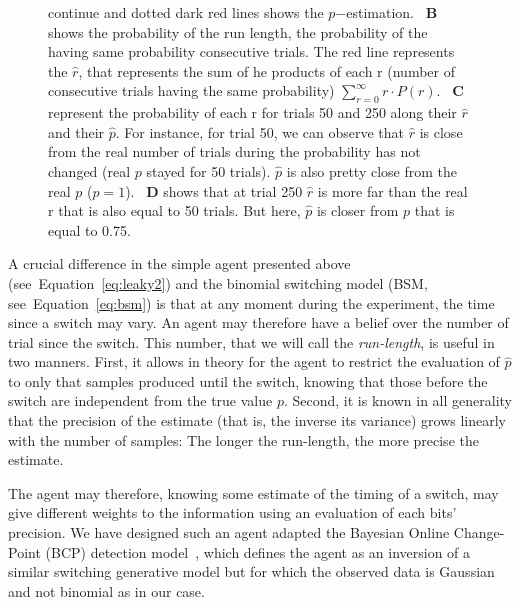 \documentclass[profile,final,english,draft]{article}%
\newcommand{\citep}[1]{\parencite{#1}}
\newcommand{\seeEq}[1]{Equation~\ref{eq:#1}}
\begin{document}
\begin{figure}
{continue and dotted dark red lines shows the $p$$-$estimation.
~\textbf{B} shows the probability of the run length, 
the probability of the having same probability consecutive trials. 
The red line represents the $\hat{r}$, 
that represents the sum of he products of each r
(number of consecutive trials having the same probability)  
$\sum_{r=0}^\infty r \cdot P(r)$.
~\textbf{C} represent the probability of each r for trials 50 and 250 
along their $\hat{r}$ and their $\hat{p}$. 
For instance, for trial 50, we can observe that $\hat{r}$ is close 
from the real number of trials during the probability has not changed (real $p$ stayed for 50 trials). 
$\hat{p}$ is also pretty close from the real $p$ ($p=1$).
~\textbf{D} shows that at trial 250 $\hat{r}$ is more far than the real r 
that is also equal to 50 trials. 
But here, $\hat{p}$ is closer from $p$ that is equal to 0.75.
}
\label{fig:bayesianchangepoint}
\end{figure}
A crucial difference in the simple agent presented above (see~\seeEq{leaky2})
and the binomial switching model (BSM, see~\seeEq{bsm})
is that at any moment during the experiment, the time since a switch may vary.
An agent may therefore have a belief over the number of trial since the switch.
This number, that we will call the \emph{run-length}, is useful in two manners. 
First, it allows in theory for the agent to restrict the evaluation of $\hat{p}$ 
to only that samples produced until the switch,
knowing that those before the switch are independent from the true value $p$.
Second, it is known in all generality that the precision of the estimate  
(that is, the inverse its variance)
grows linearly with the number of samples:
The longer the run-length, the more precise the estimate.

The agent may therefore,
knowing some estimate of the timing of a switch,
may give different weights to the information using an evaluation of each bits' precision.
We have designed such an agent 
adapted the Bayesian Online Change-Point (BCP) detection model~\citep{AdamsMackay2007},
which defines the agent as an inversion of a similar switching generative model 
but for which the observed data is Gaussian and not binomial as in our case. 
\end{document}
